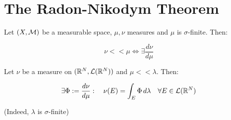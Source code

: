 \vspace{1em}

\section{The Radon-Nikodym Theorem}

\begin{ftheorem}
    Let $(X, \mathcal{M})$ be a measurable space, $\mu, \nu$ measures and 
    $\mu$ is $\sigma$-finite. Then:

    $$\nu << \mu \iff \exists \frac{d\nu}{d\mu}$$
\end{ftheorem}

\begin{fcorollary}
    Let $\nu$ be a measure on $(\mathbb{R}^N, \mathcal{L}(\mathbb{R}^N))$ and $\mu << \lambda$.
    Then:

    $$\exists \Phi := \frac{d\nu}{d\mu}: \quad \nu(E) = \int_E \Phi \, d\lambda \quad \forall E \in \mathcal{L}(\mathbb{R}^N)$$

    (Indeed, $\lambda$ is $\sigma$-finite)
\end{fcorollary}






